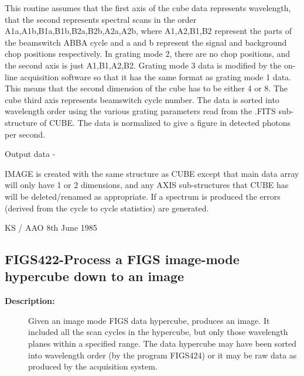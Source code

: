 \begin{description}
\begin{description}
\begin{terminalv}
 This routine assumes that the first axis of the cube data
 represents wavelength, that the second represents spectral
 scans in the order A1a,A1b,B1a,B1b,B2a,B2b,A2a,A2b, where
 A1,A2,B1,B2 represent the parts of the beamswitch ABBA cycle
 and a and b represent the signal and background chop positions
 respectively.  In grating mode 2, there are no chop positions,
 and the second axis is just A1,B1,A2,B2. Grating mode 3 data
 is modified by the on-line acquisition software so that it
 has the same format as grating mode 1 data.  This means that the
 second dimension of the cube has to be either 4 or 8.  The
 cube third axis represents beamswitch cycle number.
 The data is sorted into wavelength order using the various
 grating parameters read from the .FITS sub-structure of CUBE.
 The data is normalized to give a figure in detected photons
 per second.

 Output data -

 IMAGE is created with the same structure as CUBE
 except that main data array will only have 1 or 2 dimensions, and any
 AXIS sub-structures that CUBE has will be deleted/renamed
 as appropriate. If a spectrum is produced the errors (derived from
 the cycle to cycle statistics) are generated.

                                 KS / AAO 8th June 1985
\end{terminalv}
\end{description}
\subsection{FIGS422-\label{FIGS422}Process a FIGS image-mode hypercube down to an image}
\begin{description}

\item [\textbf{Description:}]
 Given an image mode FIGS data hypercube, produces an image.
 It included all the scan cycles in the hypercube, but only
 those wavelength planes within a specified range.  The data
 hypercube may have been sorted into wavelength order (by the
 program FIGS424) or it may be raw data as produced by the
 acquisition system.


\end{description}
\end{description}
